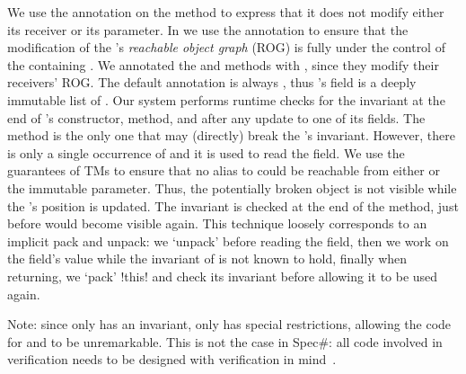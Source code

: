 We use the \Q@read@ annotation on the \Q@equals@ method to express that it does not modify either its
receiver or its parameter. In \Q@Cage@ we use 
the \Q@capsule@ annotation to ensure
that the modification of the \Q@Hamster@'s \emph{reachable object graph} (ROG) is fully under the control
of the containing \Q@Cage@. 
We annotated the \Q@move@
and \Q@moveTo@ methods with \Q@mut@, since they modify
their receivers' ROG. The default annotation is always \Q@imm@, thus \Q@Cage@'s \Q@path@ field is a deeply immutable list of \Q@Point@s.
Our system performs runtime checks for the invariant
at the end of \Q@Cage@'s constructor, \Q@moveTo@ method, and after any update to one of its fields.
The \Q@moveTo@ method is the only one that may (directly) break the \Q@Cage@'s invariant. However, there is only a single occurrence of \Q@this@ and it is used to read the \Q@h@ field. We use the guarantees of TMs to ensure that no alias to \Q@this@ could be reachable from either \Q@h@ or the immutable \Q@Point@ parameter. Thus, the potentially broken \Q@this@ object is not visible while the \Q@Hamster@'s position is updated. 
The invariant is checked at the end of the \Q@moveTo@ method, just before \Q@this@ would become visible again.
This technique loosely corresponds to an implicit pack and unpack: we `unpack' \Q@this@ before reading the field, then we work on the field's value while the invariant of \Q@this@ is not known to hold, finally when returning, we `pack' \Q!this! and check its invariant before allowing it to be used again.

Note: since only \Q@Cage@ has an invariant,
 only \Q@Cage@ has special restrictions, allowing the code for \Q@Point@ and \Q@Hamster@ to be unremarkable.
 This is not the case in Spec\#: all code involved in  verification needs to be designed with verification in mind~\cite{barnett2011specification}.

